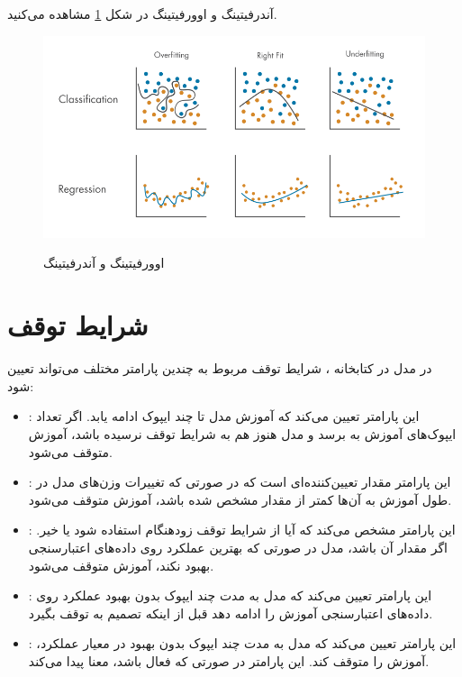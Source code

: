 \documentclass[12pt, dvipsnames, svgnames, x11names,]{article}
\begin{document}
		آندرفیتینگ و اوورفیتینگ در شکل \ref{fig:o_under_fitting} مشاهده می‌کنید.

		\begin{figure}
			\begin{center}
				{\includegraphics[width=13cm]{images/19.png}}
			\end{center}
			\caption{اوورفیتینگ و آندرفیتینگ}
			\label{fig:o_under_fitting}
		\end{figure}
		
		
	\section{شرایط توقف}
	
		در مدل  در کتابخانه ، شرایط توقف مربوط به چندین پارامتر مختلف می‌تواند تعیین شود:
		
		\begin{itemize}
			
			\item {}:
			این پارامتر تعیین می‌کند که آموزش مدل تا چند ایپوک ادامه یابد. اگر تعداد ایپوک‌های آموزش به  برسد و مدل هنوز هم به شرایط توقف نرسیده باشد، آموزش متوقف می‌شود.
			
			
			\item {}:
			این پارامتر مقدار تعیین‌کننده‌ای است که در صورتی که تغییرات وزن‌های مدل در طول آموزش به آن‌ها کمتر از مقدار مشخص شده باشد، آموزش متوقف می‌شود.
			
			
			\item {}:
			این پارامتر مشخص می‌کند که آیا از شرایط توقف زودهنگام استفاده شود یا خیر. اگر مقدار آن  باشد، مدل در صورتی که بهترین عملکرد روی داده‌های اعتبارسنجی بهبود نکند، آموزش متوقف می‌شود.
			
			
			\item {}:
			این پارامتر تعیین می‌کند که مدل به مدت چند ایپوک بدون بهبود عملکرد روی داده‌های اعتبارسنجی آموزش را ادامه دهد قبل از اینکه تصمیم به توقف بگیرد.
						
			
			\item {}:
			این پارامتر تعیین می‌کند که مدل به مدت چند ایپوک بدون بهبود در معیار عملکرد، آموزش را متوقف کند. این پارامتر در صورتی که  فعال باشد، معنا پیدا می‌کند.

			
			
		\end{itemize}
\end{document}
